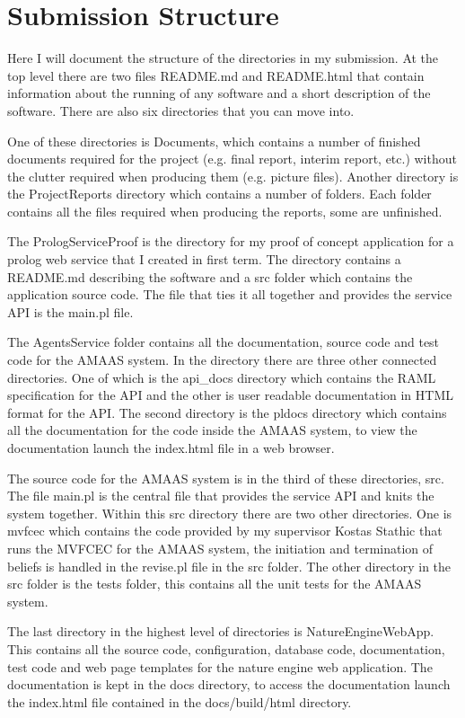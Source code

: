 \documentclass[]{final_report}
\begin{document}
\section{Submission Structure}
Here I will document the structure of the directories in my submission. At the top level there are two files README.md and README.html that contain information about the running of any software and a short description of the software. There are also six directories that you can move into.\par 
One of these directories is Documents, which contains a number of finished documents required for the project (e.g. final report, interim report, etc.) without the clutter required when producing them (e.g. picture files). Another directory is the ProjectReports directory which contains a number of folders. Each folder contains all the files required when producing the reports, some are unfinished.\par 
The PrologServiceProof is the directory for my proof of concept application for a prolog web service that I created in first term. The directory contains a README.md describing the software and a src folder which contains the application source code. The file that ties it all together and provides the service API is the main.pl file.\par 
The AgentsService folder contains all the documentation, source code and test code for the AMAAS system. In the directory there are three other connected directories. One of which is the api\_docs directory which contains the RAML specification for the API and the other is user readable documentation in HTML format for the API. The second directory is the pldocs directory which contains all the documentation for the code inside the AMAAS system, to view the documentation launch the index.html file in a web browser.\par 
The source code for the AMAAS system is in the third of these directories, src. The file main.pl is the central file that provides the service API and knits the system together. Within this src directory there are two other directories. One is mvfcec which contains the code provided by my supervisor Kostas Stathic that runs the MVFCEC for the AMAAS system, the initiation and termination of beliefs is handled in the revise.pl file in the src folder. The other directory in the src folder is the tests folder, this contains all the unit tests for the AMAAS system.\par 
The last directory in the highest level of directories is NatureEngineWebApp. This contains all the source code, configuration, database code, documentation, test code and web page templates for the nature engine web application. The documentation is kept in the docs directory, to access the documentation launch the index.html file contained in the docs/build/html directory.\par 
\end{document}
